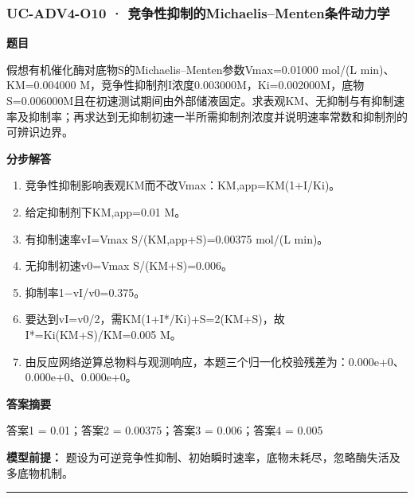\documentclass[UTF8,11pt,a4paper]{ctexart}
\begin{document}
\subsubsection*{UC-ADV4-O10 · 竞争性抑制的Michaelis–Menten条件动力学}
\noindent\textbf{题目}\par
假想有机催化酶对底物S的Michaelis–Menten参数Vmax=0.01000 mol/(L min)、KM=0.004000 M，竞争性抑制剂I浓度0.003000M，Ki=0.002000M，底物S=0.006000M且在初速测试期间由外部储液固定。求表观KM、无抑制与有抑制速率及抑制率；再求达到无抑制初速一半所需抑制剂浓度并说明速率常数和抑制剂的可辨识边界。\par
\medskip\noindent\textbf{分步解答}
\begin{enumerate}
\item 竞争性抑制影响表观KM而不改Vmax：KM,app=KM(1+I/Ki)。
\item 给定抑制剂下KM,app=0.01 M。
\item 有抑制速率vI=Vmax S/(KM,app+S)=0.00375 mol/(L min)。
\item 无抑制初速v0=Vmax S/(KM+S)=0.006。
\item 抑制率1−vI/v0=0.375。
\item 要达到vI=v0/2，需KM(1+I*/Ki)+S=2(KM+S)，故I*=Ki(KM+S)/KM=0.005 M。
\item 由反应网络逆算总物料与观测响应，本题三个归一化校验残差为：0.000e+0、0.000e+0、0.000e+0。
\end{enumerate}
\noindent\textbf{答案摘要}\par
答案1 = 0.01；答案2 = 0.00375；答案3 = 0.006；答案4 = 0.005\par
\noindent\textbf{模型前提：}
题设为可逆竞争性抑制、初始瞬时速率，底物未耗尽，忽略酶失活及多底物机制。\par
\medskip\hrule\medskip
{}
\end{document}
